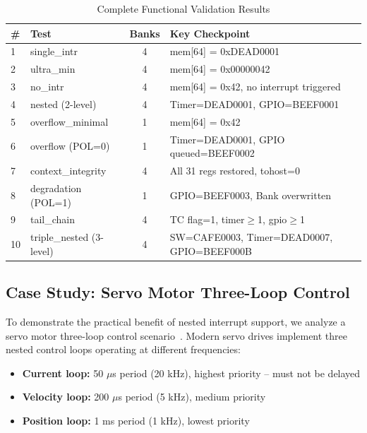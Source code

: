 \documentclass[letterpaper,journal]{IEEEtran}
\begin{document}
\begin{table}[!t]
\caption{Complete Functional Validation Results}
\label{tab:tests}
\centering
\footnotesize
\setlength{\tabcolsep}{2pt}
\begin{tabular}{@{}llcl@{}}
\toprule
\textbf{\#} & \textbf{Test} & \textbf{Banks} & \textbf{Key Checkpoint} \\
\midrule
1  & single\_intr        & 4 & mem[64] = 0xDEAD0001 \\
2  & ultra\_min          & 4 & mem[64] = 0x00000042 \\
3  & no\_intr            & 4 & mem[64] = 0x42, no interrupt triggered \\
4  & nested (2-level)    & 4 & Timer=DEAD0001, GPIO=BEEF0001 \\
5  & overflow\_minimal    & 1 & mem[64] = 0x42 \\
6  & overflow (POL=0)    & 1 & Timer=DEAD0001, GPIO queued=BEEF0002 \\
7  & context\_integrity   & 4 & All 31 regs restored, tohost=0 \\
8  & degradation (POL=1) & 1 & GPIO=BEEF0003, Bank overwritten \\
9  & tail\_chain          & 4 & TC flag=1, timer$\geq$1, gpio$\geq$1 \\
10 & triple\_nested (3-level) & 4 & SW=CAFE0003, Timer=DEAD0007, GPIO=BEEF000B \\
\bottomrule
\end{tabular}
\end{table}

\subsection{Case Study: Servo Motor Three-Loop Control}

To demonstrate the practical benefit of nested interrupt support, we analyze a servo motor three-loop control scenario~\cite{ref8}.
Modern servo drives implement three nested control loops operating at different frequencies:

\begin{itemize}
\item \textbf{Current loop:} 50 $\mu$s period (20 kHz), highest priority -- must not be delayed
\item \textbf{Velocity loop:} 200 $\mu$s period (5 kHz), medium priority
\item \textbf{Position loop:} 1 ms period (1 kHz), lowest priority
\end{itemize}
\end{document}
